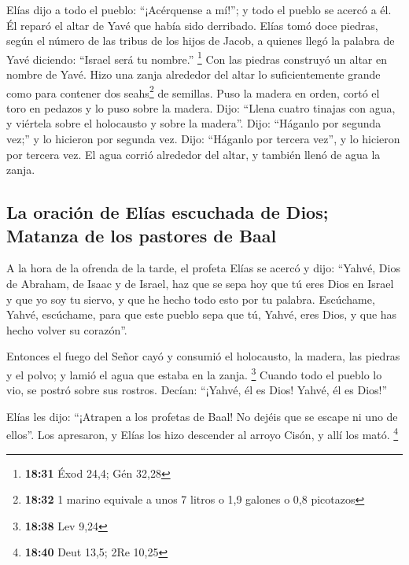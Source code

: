 \begin{paracol}{2}
 Elías dijo a todo el pueblo: ``¡Acérquense a mí!''; y
todo el pueblo se acercó a él. Él reparó el altar de Yavé que había sido
derribado.  Elías tomó doce piedras, según el número de
las tribus de los hijos de Jacob, a quienes llegó la palabra de Yavé
diciendo: ``Israel será tu nombre.'' \footnote{\textbf{18:31} Éxod 24,4;
  Gén 32,28}  Con las piedras construyó un altar en
nombre de Yavé. Hizo una zanja alrededor del altar lo suficientemente
grande como para contener dos seahs\footnote{\textbf{18:32} 1 marino
  equivale a unos 7 litros o 1,9 galones o 0,8 picotazos} de semillas.
 Puso la madera en orden, cortó el toro en pedazos y lo
puso sobre la madera. Dijo: ``Llena cuatro tinajas con agua, y viértela
sobre el holocausto y sobre la madera''.  Dijo: ``Háganlo
por segunda vez;'' y lo hicieron por segunda vez. Dijo: ``Háganlo por
tercera vez'', y lo hicieron por tercera vez.  El agua
corrió alrededor del altar, y también llenó de agua la zanja.

\hypertarget{la-oraciuxf3n-de-eluxedas-escuchada-de-dios-matanza-de-los-pastores-de-baal}{%
\subsection{La oración de Elías escuchada de Dios; Matanza de los
pastores de
Baal}\label{la-oraciuxf3n-de-eluxedas-escuchada-de-dios-matanza-de-los-pastores-de-baal}}

 A la hora de la ofrenda de la tarde, el profeta Elías se
acercó y dijo: ``Yahvé, Dios de Abraham, de Isaac y de Israel, haz que
se sepa hoy que tú eres Dios en Israel y que yo soy tu siervo, y que he
hecho todo esto por tu palabra.  Escúchame, Yahvé,
escúchame, para que este pueblo sepa que tú, Yahvé, eres Dios, y que has
hecho volver su corazón''.

 Entonces el fuego del Señor cayó y consumió el
holocausto, la madera, las piedras y el polvo; y lamió el agua que
estaba en la zanja. \footnote{\textbf{18:38} Lev 9,24} 
Cuando todo el pueblo lo vio, se postró sobre sus rostros. Decían:
``¡Yahvé, él es Dios! Yahvé, él es Dios!''

 Elías les dijo: ``¡Atrapen a los profetas de Baal! No
dejéis que se escape ni uno de ellos''. Los apresaron, y Elías los hizo
descender al arroyo Cisón, y allí los mató. \footnote{\textbf{18:40}
  Deut 13,5; 2Re 10,25}


\end{paracol}
